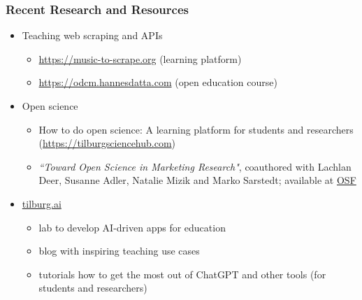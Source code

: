 \documentclass[8pt]{beamer}
\begin{document}
\begin{frame}

\frametitle{Recent Research and Resources}

\begin{itemize}

    \item Teaching web scraping and APIs
        \begin{itemize}
            \item \url{https://music-to-scrape.org} (learning platform)
            \item \url{https://odcm.hannesdatta.com} (open education course)    
        \end{itemize}
    \item Open science
        \begin{itemize}
            \item How to do open science: A learning platform for students and researchers (\url{https://tilburgsciencehub.com})
            \item \textit{``Toward Open Science in Marketing Research"}, coauthored with Lachlan Deer, Susanne Adler, Natalie Mizik and Marko Sarstedt; available at \href{https://osf.io/preprints/osf/f7a8c}{OSF}
        \end{itemize}
    \item \href{https://tilburg.ai}{tilburg.ai}
        \begin{itemize}
            \item lab to develop AI-driven apps for education
            \item blog with inspiring teaching use cases
            \item tutorials how to get the most out of ChatGPT and other tools (for students and researchers)
        \end{itemize}
\end{itemize}
    
\end{frame}



\end{document}
